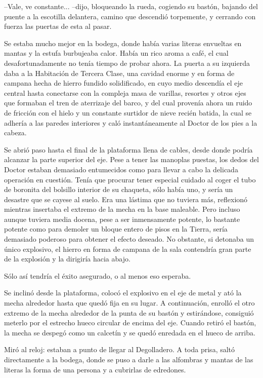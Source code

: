 --Vale, ve constante... --dijo, bloqueando la rueda, cogiendo su bastón, bajando del puente a la escotilla delantera, camino que descendió torpemente, y cerrando con fuerza las puertas de esta al pasar.
 
Se estaba mucho mejor en la bodega, donde había varias literas envueltas en mantas y la estufa burbujeaba calor. Había un rico aroma a café, el cual desafortunadamente no tenía tiempo de probar ahora. La puerta a su izquierda daba a la Habitación de Tercera Clase, una cavidad enorme y en forma de campana hecha de hierro fundido solidificado, en cuyo medio descendía el eje central hasta conectarse con la compleja masa de varillas, resortes y otros ejes que formaban el tren de aterrizaje del barco, y del cual provenía ahora un ruido de fricción con el hielo y un constante surtidor de nieve recién batida, la cual se adhería a las paredes interiores y caló instantáneamente al Doctor de los pies a la cabeza.
 
Se abrió paso hasta el final de la plataforma llena de cables, desde donde podría alcanzar la parte superior del eje. Pese a tener las manoplas puestas, los dedos del Doctor estaban demasiado entumecidos como para llevar a cabo la delicada operación en cuestión. Tenía que procurar tener especial cuidado al coger el tubo de boronita del bolsillo interior de su chaqueta, sólo había uno, y sería un desastre que se cayese al suelo. Era una lástima que no tuviera más, reflexionó mientras insertaba el extremo de la mecha en la base maleable. Pero incluso aunque tuviera media docena, pese a ser inmensamente potente, lo bastante potente como para demoler un bloque entero de pisos en la Tierra, sería demasiado poderoso para obtener el efecto deseado. No obstante, si detonaba un único explosivo, el hierro en forma de campana de la sala contendría gran parte de la explosión y la dirigiría hacia abajo.
 
Sólo así tendría el éxito asegurado, o al menos eso esperaba.
 
Se inclinó desde la plataforma, colocó el explosivo en el eje de metal y ató la mecha alrededor hasta que quedó fija en su lugar. A continuación, enrolló el otro extremo de la mecha alrededor de la punta de su bastón y estirándose, consiguió meterlo por el estrecho hueco circular de encima del eje. Cuando retiró el bastón, la mecha se despegó como un calcetín y se quedó enredada en el hueco de arriba.
 
Miró al reloj: estaban a punto de llegar al Degolladero. A toda prisa, saltó directamente a la bodega, donde se puso a darle a las alfombras y mantas de las literas la forma de una persona y a cubrirlas de edredones.
 

